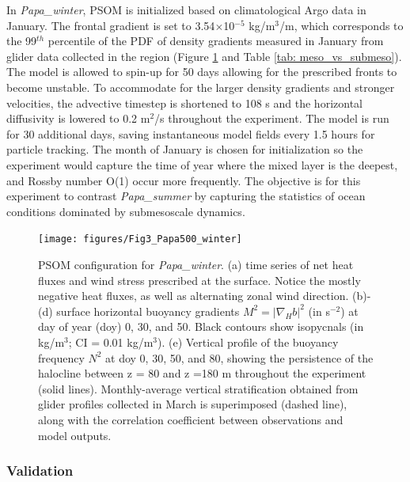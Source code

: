 \documentclass[draft,linenumbers]{agujournal2018}
\begin{document}
In \textit{Papa\_winter}, PSOM is initialized based on climatological Argo data in January. The frontal gradient is set to 3.54$\times$10$^{-5}$ kg/m$^3$/m, which corresponds to the 99$^{th}$ percentile of the PDF of density gradients measured in January from glider data collected in the region (Figure \ref{fig: Papa_winter} and Table \ref{tab: meso_vs_submeso}). The model is allowed to spin-up for 50 days allowing for the prescribed fronts to become unstable. To accommodate for the larger density gradients and stronger velocities, the advective timestep is shortened to 108 s and the horizontal diffusivity is lowered to 0.2 m$^2$/s throughout the experiment. The model is run for 30 additional days, saving instantaneous model fields every 1.5 hours for particle tracking. The month of January is chosen for initialization so the experiment would capture the time of year where the mixed layer is the deepest, and Rossby number O(1) occur more frequently. The objective is for this experiment to contrast \textit{Papa\_summer} by capturing the statistics of ocean conditions dominated by submesoscale dynamics.

\begin{figure}[ht]
	\texttt{[image: figures/Fig3\_Papa500\_winter]}
	\caption{PSOM configuration for \textit{Papa\_winter}. (a) time series of net heat fluxes and wind stress prescribed at the surface. Notice the mostly negative heat fluxes, as well as alternating zonal wind direction. (b)-(d) surface horizontal buoyancy gradients $M^2 = |\nabla_Hb|^2$ (in s$^{-2}$) at day of year (doy) 0, 30, and 50. Black contours show isopycnals (in kg/m$^3$; CI = 0.01 kg/m$^3$). (e) Vertical profile of the buoyancy frequency $N^2$ at doy 0, 30, 50, and 80, showing the persistence of the halocline between z = 80 and z =180 m throughout the experiment (solid lines). Monthly-average vertical stratification obtained from glider profiles collected in March is superimposed (dashed line), along with the correlation coefficient between observations and model outputs.}
	\label{fig: Papa_winter}
\end{figure}


\subsubsection{Validation}
\label{sec: glider_validation}
\end{document}
